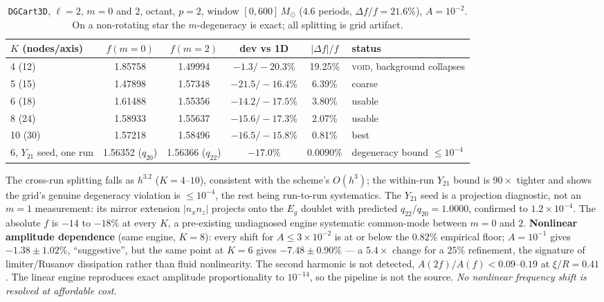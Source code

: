 \documentclass[aps,prd,preprint,amsmath,amssymb,nofootinbib,longbibliography]{revtex4-2}
\newcommand{\Msun}{M_\odot}
\newcommand{\void}{\textsc{void}}
\begin{document}
\begin{table}[htbp]
\caption{\texttt{DGCart3D}, $\ell=2$, $m=0$ and $2$, octant, $p=2$, window $[0,600]\,\Msun$
(4.6 periods, $\Delta f/f = 21.6\%$), $A = 10^{-2}$. On a non-rotating star the $m$-degeneracy is
exact; all splitting is grid artifact.}
\label{tab:dg3d}
\footnotesize
\begin{ruledtabular}
\begin{tabular}{lccccl}
$K$ (nodes/axis) & $f(m{=}0)$ & $f(m{=}2)$ & dev vs 1D & $|\Delta f|/f$ & status\\
\hline
4 (12) & 1.85758 & 1.49994 & $-1.3/-20.3\%$ & 19.25\% & \void, background collapses\\
5 (15) & 1.47898 & 1.57348 & $-21.5/-16.4\%$ & 6.39\% & coarse\\
6 (18) & 1.61488 & 1.55356 & $-14.2/-17.5\%$ & 3.80\% & usable\\
8 (24) & 1.58933 & 1.55637 & $-15.6/-17.3\%$ & 2.07\% & usable\\
10 (30) & 1.57218 & 1.58496 & $-16.5/-15.8\%$ & 0.81\% & best\\
6, $Y_{21}$ seed, one run & 1.56352 ($q_{20}$) & 1.56366 ($q_{22}$) & $-17.0\%$ & $0.0090\%$ & degeneracy bound $\le10^{-4}$\\
\end{tabular}
\end{ruledtabular}
\end{table}

The cross-run splitting falls as $h^{3.2}$ ($K=4$--$10$), consistent with the scheme's $O(h^3)$;
the within-run $Y_{21}$ bound is $90\times$ tighter and shows the grid's genuine degeneracy
violation is $\le10^{-4}$, the rest being run-to-run systematics. The $Y_{21}$ seed is a projection
diagnostic, not an $m=1$ measurement: its mirror extension $|n_xn_z|$ projects onto the $E_g$
doublet with predicted $q_{22}/q_{20} = 1.0000$, confirmed to $1.2\times10^{-4}$. The absolute
$f$ is $-14$ to $-18\%$ at every $K$, a pre-existing undiagnosed engine systematic common-mode
between $m=0$ and $2$. \textbf{Nonlinear amplitude dependence} (same engine, $K=8$): every shift
for $A\le3\times10^{-2}$ is at or below the $0.82\%$ empirical floor; $A=10^{-1}$ gives
$-1.38\pm1.02\%$, ``suggestive'', but the same point at $K=6$ gives $-7.48\pm0.90\%$ --- a
$5.4\times$ change for a $25\%$ refinement, the signature of limiter/Rusanov dissipation rather
than fluid nonlinearity. The second harmonic is not detected, $A(2f)/A(f)<0.09$--$0.19$ at
$\xi/R = 0.41$. The linear engine reproduces exact amplitude proportionality to $10^{-14}$, so the
pipeline is not the source. \emph{No nonlinear frequency shift is resolved at affordable cost.}
\end{document}
